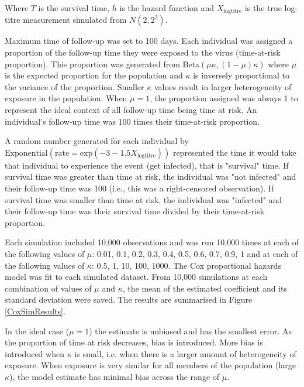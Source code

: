 Where $T$ is the survival time, $h$ is the hazard function and $X_{\text{logtitre}}$ is the true log-titre measurement simulated from $N(2, 2^2)$.

Maximum time of follow-up was set to 100 days. Each individual was assigned a proportion of the follow-up time they were exposed to the virus (time-at-risk proportion). This proportion was generated from $\text{Beta}(\mu \kappa, (1 - \mu) \kappa)$ where $\mu$ is the expected proportion for the population and $\kappa$ is inversely proportional to the variance of the proportion. Smaller $\kappa$ values result in larger heterogeneity of exposure in the population. When $\mu = 1$, the proportion assigned was always 1 to represent the ideal context of all follow-up time being time at risk. An individual's follow-up time was 100 times their time-at-risk proportion.

A random number generated for each individual by $\text{Exponential}(\text{rate} = \text{exp}(-3 - 1.5 X_{\text{logtitre}}) )$ represented the time it would take that individual to experience the event (get infected), that is "survival" time. If survival time was greater than time at risk, the individual was "not infected" and their follow-up time was 100 (i.e., this was a right-censored observation). If survival time was smaller than time at risk, the individual was "infected" and their follow-up time was their survival time divided by their time-at-risk proportion.

Each simulation included 10,000 observations and was run 10,000 times at each of the following values of $\mu$: 0.01, 0.1, 0.2, 0.3, 0.4, 0.5, 0.6, 0.7, 0.9, 1 and at each of the following values of $\kappa$: 0.5, 1, 10, 100, 1000. The Cox proportional hazards model was fit to each simulated dataset. From 10,000 simulations at each combination of values of $\mu$ and $\kappa$, the mean of the estimated coefficient and its standard deviation were saved. The results are summarised in Figure \ref{CoxSimResults}.

In the ideal case ($\mu = 1$) the estimate is unbiased and has the smallest error. As the proportion of time at risk decreases, bias is introduced. More bias is introduced when $\kappa$ is small, i.e. when there is a larger amount of heterogeneity of exposure. When exposure is very similar for all members of the population (large $\kappa$), the model estimate has minimal bias across the range of $\mu$.

